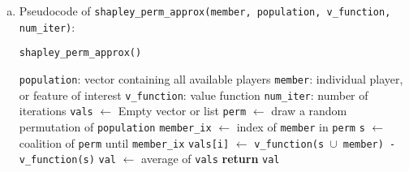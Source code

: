 {\begin{enumerate}[a)]
	Pseudocode of \texttt{shapley\_set(member, population, v\_function)}:
	
	\begin{algorithm}[h]
		\caption{\texttt{shapley\_set()}}
		\begin{algorithmic}[1]
			\Require \texttt{population}: vector containing all available players
			\Require \texttt{member}: individual player, or feature of interest
			\Require \texttt{v\_function}: Some value function
			\State \texttt{remainder} $\gets$ everyone from the \texttt{population} but \texttt{member}; \texttt{population} $\setminus$ \texttt{first\_member}
			\State \texttt{all\_sets\_wo\_member} $\gets$ \texttt{all\_unique\_subsets(remainder)}
			\State \texttt{F} $\gets$ length of \texttt{population}
			\State \texttt{val} $\gets$ 0
			\State \texttt{S} $\gets$ length of \texttt{s}
			\State \texttt{diff} $\gets$ \texttt{v\_function(s $\cup$ member) - v\_function(s)}
			\State \texttt{factor} $\gets$ \texttt{S! * (F - S - 1)! / F}!
			\State \texttt{val} $\gets$ \texttt{val + factor * diff}
			\EndFor
			\State \textbf{return} \texttt{val}
		\end{algorithmic}
	\end{algorithm}

	\item
    Pseudocode of \texttt{shapley\_perm\_approx(member, population, v\_function, num\_iter)}:
	
	\begin{algorithm}[H]
		\caption{\texttt{shapley\_perm\_approx()}}
		\begin{algorithmic}[1]
			\Require \texttt{population}: vector containing all available players
			\Require \texttt{member}: individual player, or feature of interest
			\Require \texttt{v\_function}: value function
			\Require \texttt{num\_iter}: number of iterations
            \texttt{vals} $\gets$ Empty vector or list
			\State \texttt{perm} $\gets$ draw a random permutation of \texttt{population}
			\State \texttt{member\_ix} $\gets$ index of \texttt{member} in \texttt{perm}
			\State \texttt{s} $\gets$ coalition of \texttt{perm} until \texttt{member\_ix}
			\State \texttt{vals[i]} $\gets$ \texttt{v\_function(s $\cup$ member) - v\_function(s)}
			\EndFor
			\State \texttt{val} $\gets$ average of \texttt{vals}
			\State \textbf{return} \texttt{val}
		\end{algorithmic}
	\end{algorithm}
	

\end{enumerate}}
